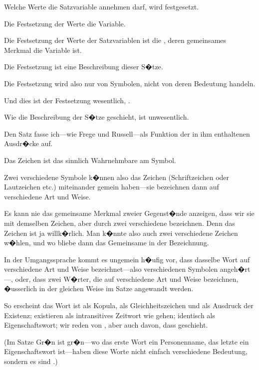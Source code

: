 {Welche Werte die Satzvariable annehmen darf,
wird festgesetzt.

Die Festsetzung der Werte  die Variable.}


{Die Festsetzung der Werte der Satzvariablen
ist die , deren gemeinsames
Merkmal die Variable ist.

Die Festsetzung ist eine Beschreibung dieser
S�tze.

Die Festsetzung wird also nur von Symbolen,
nicht von deren Bedeutung handeln.

Und  dies ist der Festsetzung wesentlich,
.

Wie die Beschreibung der S�tze geschieht, ist
unwesentlich.}


{Den Satz fasse ich---wie Frege und Russell---als
Funktion der in ihm enthaltenen Ausdr�cke auf.}


{Das Zeichen ist das sinnlich Wahrnehmbare am
Symbol.}


{Zwei verschiedene Symbole k�nnen also das
Zeichen (Schriftzeichen oder Lautzeichen etc.)
miteinander gemein haben---sie bezeichnen dann
auf verschiedene Art und Weise.}


{Es kann nie das gemeinsame Merkmal zweier
Gegenst�nde anzeigen, dass wir sie mit demselben
Zeichen, aber durch zwei verschiedene 
bezeichnen. Denn das Zeichen
ist ja willk�rlich. Man k�nnte also auch zwei verschiedene
Zeichen w�hlen, und wo bliebe dann das
Gemeinsame in der Bezeichnung.}


{In der Umgangssprache kommt es ungemein
h�ufig vor, dass dasselbe Wort auf verschiedene
Art und Weise bezeichnet---also verschiedenen
Symbolen an\-ge\-h�rt---, oder, dass zwei W�rter,
die auf verschiedene Art und Weise bezeichnen,
�usserlich in der gleichen Weise im Satze angewandt
werden.

So erscheint das Wort \glqq{}ist\grqq{} als Kopula, als
Gleichheitszeichen und als Ausdruck der Existenz;
\glqq{}existieren\grqq{} als intransitives Zeitwort wie \glqq{}gehen\grqq{};
\glqq{}identisch\grqq{} als Eigenschaftswort; wir reden von
, aber auch davon, dass  geschieht.

(Im Satze \glqq{}Gr�n ist gr�n\grqq{}---wo das erste Wort
ein Personenname, das letzte ein Eigenschaftswort
ist---haben diese Worte nicht einfach verschiedene
Bedeutung, sondern es sind .)}



